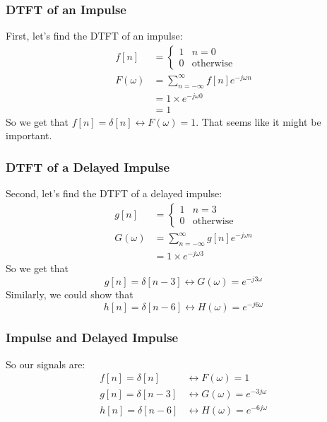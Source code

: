 \documentclass{beamer}
\begin{document}
\begin{frame}
  \frametitle{DTFT of an Impulse}

  First, let's find the DTFT of an impulse:
  \begin{align*}
    f[n] &= \begin{cases}1&n=0\\0&\mbox{otherwise}\end{cases}\\
    F(\omega) &= \sum_{n=-\infty}^\infty f[n]e^{-j\omega n}\\
    &= 1\times e^{-j\omega 0}\\
    &= 1
  \end{align*}
  So we get that $f[n]=\delta[n]\leftrightarrow F(\omega)=1$.  That
  seems like it might be important.
\end{frame}

\begin{frame}
  \frametitle{DTFT of a Delayed Impulse}

  Second, let's find the DTFT of a delayed impulse:
  \begin{align*}
    g[n] &= \begin{cases}1&n=3\\0&\mbox{otherwise}\end{cases}\\
    G(\omega) &= \sum_{n=-\infty}^\infty g[n]e^{-j\omega n}\\
    &= 1\times e^{-j\omega 3}
  \end{align*}
  So we get that
  \[
  g[n]=\delta[n-3]\leftrightarrow G(\omega)=e^{-j3\omega}
  \]
  Similarly, we could show that
  \[
  h[n]=\delta[n-6]\leftrightarrow H(\omega)=e^{-j6\omega}
  \]
\end{frame}

\begin{frame}
  \frametitle{Impulse and Delayed Impulse}

  So our signals are:
  \begin{align*}
    f[n] = \delta[n] &\leftrightarrow F(\omega)=1\\
    g[n] = \delta[n-3] &\leftrightarrow G(\omega)=e^{-3j\omega}\\
    h[n] = \delta[n-6] &\leftrightarrow H(\omega)=e^{-6j\omega}
  \end{align*}
\end{frame}
\end{document}
